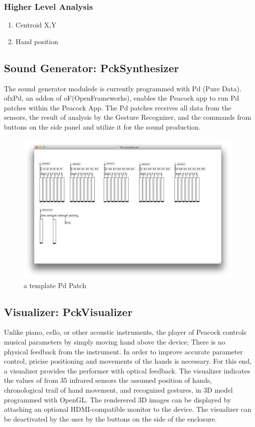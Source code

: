 \documentclass{nime-alternate}
\begin{document}
\subsubsection{Higher Level Analysis}

\begin{enumerate}
       \item Centroid X,Y
       \item Hand position
\end{enumerate}

\subsection{Sound Generator: PckSynthesizer}

The sound generator modulede is currently programmed with Pd (Pure Data). ofxPd, an addon of oF(OpenFrameworks), enables the Peacock app to run Pd patches within the Peacock App. The Pd patches receives all data from the sensors, the result of analysis by the Gesture Recognizer, and the commands from buttons on the side panel and utilize it for the sound production.

\begin{figure}[htbp]
       \centering
              \includegraphics[width=1\columnwidth]{pd_patch}
       \caption{a template Pd Patch}
       \label{fig:modules}
\end{figure}
 
\subsection{Visualizer: PckVisualizer}

Unlike piano, cello, or other acoustic instruments, the player of Peacock controls musical parameters by simply moving hand above the device; There is no physical feedback from the instrument. In order to improve accurate parameter control, pricise positioning and movements of the hands is necessary. For this end, a visualizer provides the performer with optical feedback.  The visualizer indicates the values of from 35 infrared sensors  the assumed position of hands, chronological trail of hand movement, and recognized gestures, in  3D model programmed with OpenGL. The renderered 3D images can be displayed by attaching an optional HDMI-compatible monitor to the device.
The visualizer can be deactivated by the user by the buttons on the side of the enclosure.
\end{document}
